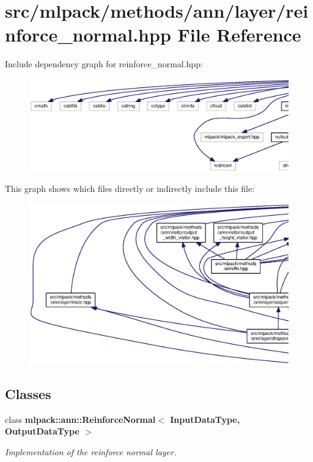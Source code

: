 \section{src/mlpack/methods/ann/layer/reinforce\+\_\+normal.hpp File Reference}
\label{reinforce__normal_8hpp}
Include dependency graph for reinforce\+\_\+normal.\+hpp\+:
\nopagebreak
\begin{figure}[H]
\begin{center}
\leavevmode
\includegraphics[width=350pt]{reinforce__normal_8hpp__incl}
\end{center}
\end{figure}
This graph shows which files directly or indirectly include this file\+:
\nopagebreak
\begin{figure}[H]
\begin{center}
\leavevmode
\includegraphics[width=350pt]{reinforce__normal_8hpp__dep__incl}
\end{center}
\end{figure}
\subsection*{Classes}
\begin{DoxyCompactItemize}
\item 
class {\bf mlpack\+::ann\+::\+Reinforce\+Normal$<$ Input\+Data\+Type, Output\+Data\+Type $>$}
\begin{DoxyCompactList}\small\item\em Implementation of the reinforce normal layer. \end{DoxyCompactList}\end{DoxyCompactItemize}
